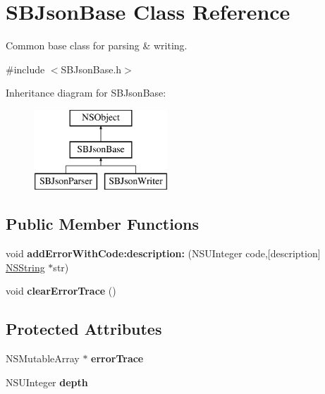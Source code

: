 \hypertarget{interface_s_b_json_base}{
\section{\-S\-B\-Json\-Base \-Class \-Reference}
\label{interface_s_b_json_base}
}


\-Common base class for parsing \& writing.  




{\ttfamily \#include $<$\-S\-B\-Json\-Base.\-h$>$}

\-Inheritance diagram for \-S\-B\-Json\-Base\-:\begin{figure}[H]
\begin{center}
\leavevmode
\includegraphics[height=3.000000cm]{interface_s_b_json_base}
\end{center}
\end{figure}
\subsection*{\-Public \-Member \-Functions}
\begin{DoxyCompactItemize}
\item 
\hypertarget{interface_s_b_json_base_af6fc685c386c1c4528bd30b2bd630d56}{
void {\bfseries add\-Error\-With\-Code\-:description\-:} (\-N\-S\-U\-Integer code,\mbox{[}description\mbox{]} \hyperlink{class_n_s_string}{\-N\-S\-String} $\ast$str)}
\label{interface_s_b_json_base_af6fc685c386c1c4528bd30b2bd630d56}

\item 
\hypertarget{interface_s_b_json_base_a6a429d6db2149fea7435b9e0aac5d3fa}{
void {\bfseries clear\-Error\-Trace} ()}
\label{interface_s_b_json_base_a6a429d6db2149fea7435b9e0aac5d3fa}

\end{DoxyCompactItemize}
\subsection*{\-Protected \-Attributes}
\begin{DoxyCompactItemize}
\item 
\hypertarget{interface_s_b_json_base_a9fd64724d5da34a0f9842cee3d14620c}{
\-N\-S\-Mutable\-Array $\ast$ {\bfseries error\-Trace}}
\label{interface_s_b_json_base_a9fd64724d5da34a0f9842cee3d14620c}

\item 
\hypertarget{interface_s_b_json_base_a5e80155581d240f565ec4149ad812e03}{
\-N\-S\-U\-Integer {\bfseries depth}}
\label{interface_s_b_json_base_a5e80155581d240f565ec4149ad812e03}

\end{DoxyCompactItemize}
